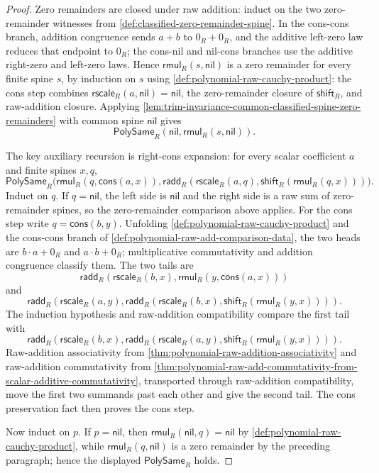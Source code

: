 \begin{proof}
Zero remainders are closed under raw addition: induct on the two zero-remainder witnesses from \autoref{def:classified-zero-remainder-spine}. In the cons-cons branch, addition congruence sends $a+b$ to $0_R+0_R$, and the additive left-zero law reduces that endpoint to $0_R$; the cons-nil and nil-cons branches use the additive right-zero and left-zero laws. Hence $\mathsf{rmul}_R(s,\mathsf{nil})$ is a zero remainder for every finite spine $s$, by induction on $s$ using \autoref{def:polynomial-raw-cauchy-product}: the cons step combines $\mathsf{rscale}_R(a,\mathsf{nil})=\mathsf{nil}$, the zero-remainder closure of $\mathsf{shift}_R$, and raw-addition closure. Applying \autoref{lem:trim-invariance-common-classified-spine-zero-remainders} with common spine $\mathsf{nil}$ gives
$$
\mathsf{PolySame}_R(\mathsf{nil},\mathsf{rmul}_R(s,\mathsf{nil})).
$$

The key auxiliary recursion is right-cons expansion: for every scalar coefficient $a$ and finite spines $x,q$,
$$
\mathsf{PolySame}_R\bigl(\mathsf{rmul}_R(q,\mathsf{cons}(a,x)),
\mathsf{radd}_R(\mathsf{rscale}_R(a,q),\mathsf{shift}_R(\mathsf{rmul}_R(q,x)))\bigr).
$$
Induct on $q$. If $q=\mathsf{nil}$, the left side is $\mathsf{nil}$ and the right side is a raw sum of zero-remainder spines, so the zero-remainder comparison above applies. For the cons step write $q=\mathsf{cons}(b,y)$. Unfolding \autoref{def:polynomial-raw-cauchy-product} and the cons-cons branch of \autoref{def:polynomial-raw-add-comparison-data}, the two heads are $b\cdot a+0_R$ and $a\cdot b+0_R$; multiplicative commutativity and addition congruence classify them. The two tails are
$$
\mathsf{radd}_R(\mathsf{rscale}_R(b,x),\mathsf{rmul}_R(y,\mathsf{cons}(a,x)))
$$
and
$$
\mathsf{radd}_R(\mathsf{rscale}_R(a,y),\mathsf{radd}_R(\mathsf{rscale}_R(b,x),\mathsf{shift}_R(\mathsf{rmul}_R(y,x)))).
$$
The induction hypothesis and raw-addition compatibility compare the first tail with
$$
\mathsf{radd}_R(\mathsf{rscale}_R(b,x),\mathsf{radd}_R(\mathsf{rscale}_R(a,y),\mathsf{shift}_R(\mathsf{rmul}_R(y,x)))).
$$
Raw-addition associativity from \autoref{thm:polynomial-raw-addition-associativity} and raw-addition commutativity from \autoref{thm:polynomial-raw-add-commutativity-from-scalar-additive-commutativity}, transported through raw-addition compatibility, move the first two summands past each other and give the second tail. The cons preservation fact then proves the cons step.

Now induct on $p$. If $p=\mathsf{nil}$, then $\mathsf{rmul}_R(\mathsf{nil},q)=\mathsf{nil}$ by \autoref{def:polynomial-raw-cauchy-product}, while $\mathsf{rmul}_R(q,\mathsf{nil})$ is a zero remainder by the preceding paragraph; hence the displayed $\mathsf{PolySame}_R$ holds.


\end{proof}
